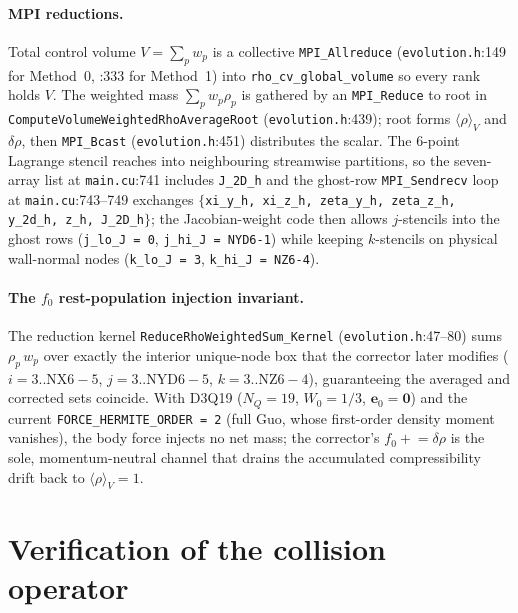 \documentclass[11pt]{article}
\theoremstyle{definition}
\theoremstyle{remark}
\providecommand{\path}[1]{\texttt{#1}}
\begin{document}
\paragraph{MPI reductions.}
Total control volume $V=\sum_p w_p$ is a collective \texttt{MPI\_Allreduce}
(\path{evolution.h}:149 for Method~0, :333 for Method~1) into
\texttt{rho\_cv\_global\_volume} so every rank holds $V$. The weighted mass
$\sum_p w_p\rho_p$ is gathered by an \texttt{MPI\_Reduce} to root in
\texttt{ComputeVolumeWeightedRhoAverageRoot} (\path{evolution.h}:439); root forms
$\langle\rho\rangle_V$ and $\delta\rho$, then \texttt{MPI\_Bcast}
(\path{evolution.h}:451) distributes the scalar. The 6-point Lagrange stencil
reaches into neighbouring streamwise partitions, so the seven-array list at
\path{main.cu}:741 includes \texttt{J\_2D\_h} and the ghost-row
\texttt{MPI\_Sendrecv} loop at \path{main.cu}:743--749 exchanges
$\{$\texttt{xi\_y\_h, xi\_z\_h, zeta\_y\_h, zeta\_z\_h, y\_2d\_h, z\_h, J\_2D\_h}$\}$;
the Jacobian-weight code then allows $j$-stencils into the ghost rows
(\texttt{j\_lo\_J = 0}, \texttt{j\_hi\_J = NYD6-1}) while keeping $k$-stencils on
physical wall-normal nodes (\texttt{k\_lo\_J = 3}, \texttt{k\_hi\_J = NZ6-4}).

\paragraph{The \texorpdfstring{$f_0$}{f0} rest-population injection invariant.}
The reduction kernel \texttt{ReduceRhoWeightedSum\_Kernel}
(\path{evolution.h}:47--80) sums $\rho_p\,w_p$ over exactly the interior unique-node
box that the corrector later modifies ($i=3..\text{NX6}{-}5$,
$j=3..\text{NYD6}{-}5$, $k=3..\text{NZ6}{-}4$), guaranteeing the averaged and
corrected sets coincide. With D3Q19 ($N_Q=19$, $W_0=1/3$, $\mathbf e_0=\mathbf0$)
and the current \texttt{FORCE\_HERMITE\_ORDER = 2} (full Guo, whose first-order
density moment vanishes), the body force injects no net mass; the corrector's
$f_0\mathrel{+}=\delta\rho$ is the sole, momentum-neutral channel that drains the
accumulated compressibility drift back to $\langle\rho\rangle_V=1$.

\section{Verification of the collision operator}
\label{sec:mrt}
\end{document}
